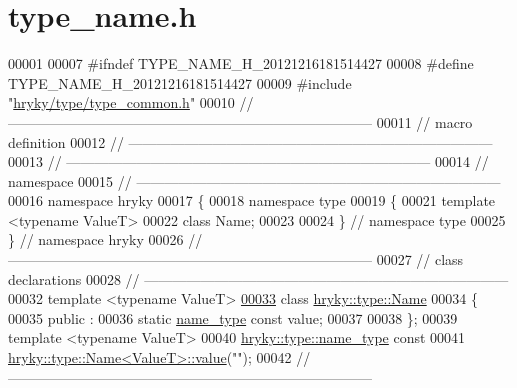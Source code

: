 \hypertarget{type__name_8h_source}{\section{type\-\_\-name.\-h}
}

\begin{DoxyCode}
00001 
00007 \textcolor{preprocessor}{#ifndef TYPE\_NAME\_H\_20121216181514427}
00008 \textcolor{preprocessor}{}\textcolor{preprocessor}{#define TYPE\_NAME\_H\_20121216181514427}
00009 \textcolor{preprocessor}{}\textcolor{preprocessor}{#include "\hyperlink{type__common_8h}{hryky/type/type_common.h}"}
00010 \textcolor{comment}{//
      ------------------------------------------------------------------------------}
00011 \textcolor{comment}{// macro definition}
00012 \textcolor{comment}{//
      ------------------------------------------------------------------------------}
00013 \textcolor{comment}{//
      ------------------------------------------------------------------------------}
00014 \textcolor{comment}{// namespace}
00015 \textcolor{comment}{//
      ------------------------------------------------------------------------------}
00016 \textcolor{keyword}{namespace }hryky
00017 \{
00018 \textcolor{keyword}{namespace }type
00019 \{
00021     \textcolor{keyword}{template} <\textcolor{keyword}{typename} ValueT>
00022     \textcolor{keyword}{class }Name;
00023 
00024 \} \textcolor{comment}{// namespace type}
00025 \} \textcolor{comment}{// namespace hryky}
00026 \textcolor{comment}{//
      ------------------------------------------------------------------------------}
00027 \textcolor{comment}{// class declarations}
00028 \textcolor{comment}{//
      ------------------------------------------------------------------------------}
00032 \textcolor{comment}{}\textcolor{keyword}{template} <\textcolor{keyword}{typename} ValueT>
\hypertarget{type__name_8h_source_l00033}{}\hyperlink{classhryky_1_1type_1_1_name}{00033} \textcolor{keyword}{class }\hyperlink{classhryky_1_1type_1_1_name}{hryky::type::Name}
00034 \{
00035 \textcolor{keyword}{public} :
00036     \textcolor{keyword}{static} \hyperlink{classhryky_1_1_literal_string}{name_type} \textcolor{keyword}{const} value;
00037 
00038 \};
00039 \textcolor{keyword}{template} <\textcolor{keyword}{typename} ValueT>
00040 \hyperlink{classhryky_1_1_literal_string}{hryky::type::name_type} \textcolor{keyword}{const}
00041 \hyperlink{classhryky_1_1type_1_1_name}{hryky::type::Name<ValueT>::value}(\textcolor{stringliteral}{""});
00042 \textcolor{comment}{//
      ------------------------------------------------------------------------------}

\end{DoxyCode}
